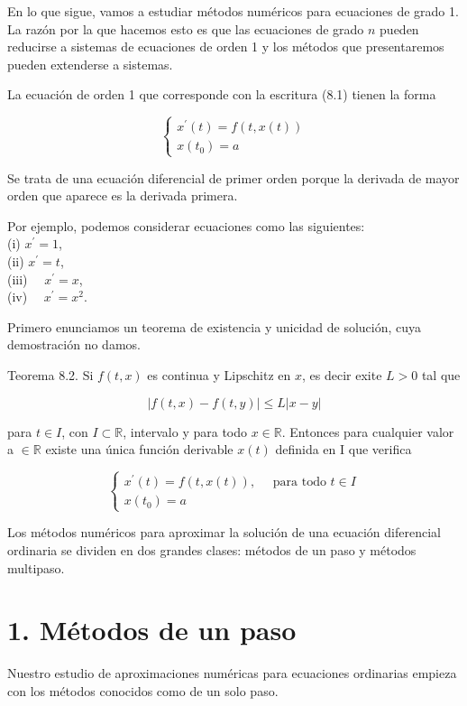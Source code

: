 \documentclass[10pt]{article}
\begin{document}
En lo que sigue, vamos a estudiar métodos numéricos para ecuaciones de grado 1. La razón por la que hacemos esto es que las ecuaciones de grado $n$ pueden reducirse a sistemas de ecuaciones de orden 1 y los métodos que presentaremos pueden extenderse a sistemas.

La ecuación de orden 1 que corresponde con la escritura (8.1) tienen la forma

\[
\left\{\begin{array}{l}
x^{\prime}(t)=f(t, x(t))  \tag{8.2}\\
x\left(t_{0}\right)=a
\end{array}\right.
\]

Se trata de una ecuación diferencial de primer orden porque la derivada de mayor orden que aparece es la derivada primera.

Por ejemplo, podemos considerar ecuaciones como las siguientes:\\
(i) $x^{\prime}=1$,\\
(ii) $x^{\prime}=t$,\\
(iii) $\quad x^{\prime}=x$,\\
(iv) $\quad x^{\prime}=x^{2}$.

Primero enunciamos un teorema de existencia y unicidad de solución, cuya demostración no damos.

Teorema 8.2. Si $f(t, x)$ es continua y Lipschitz en $x$, es decir exite $L>0$ tal que

$$
|f(t, x)-f(t, y)| \leq L|x-y|
$$

para $t \in I$, con $I \subset \mathbb{R}$, intervalo y para todo $x \in \mathbb{R}$. Entonces para cualquier valor a $\in \mathbb{R}$ existe una única función derivable $x(t)$ definida en I que verifica

$$
\left\{\begin{array}{l}
x^{\prime}(t)=f(t, x(t)), \quad \text { para todo } t \in I \\
x\left(t_{0}\right)=a
\end{array}\right.
$$

Los métodos numéricos para aproximar la solución de una ecuación diferencial ordinaria se dividen en dos grandes clases: métodos de un paso y métodos multipaso.

\section*{1. Métodos de un paso}
Nuestro estudio de aproximaciones numéricas para ecuaciones ordinarias empieza con los métodos conocidos como de un solo paso.
\end{document}

